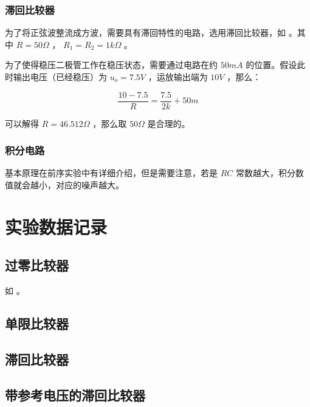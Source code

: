 \documentclass[lang=cn,11pt,a4paper,cite=authoryear]{elegantpaper}
\begin{document}

\subsubsection{滞回比较器}

为了将正弦波整流成方波，需要具有滞回特性的电路，选用滞回比较器，如  。其中 \(R = 50 \Omega\) ， \(R_1 = R_2 = 1 k\Omega\) 。

为了使得稳压二极管工作在稳压状态，需要通过电路在约 \(50 mA\) 的位置。假设此时输出电压（已经稳压）为 \(u_o = 7.5 V\) ，运放输出端为 \(10 V\) ，那么：

\[\frac{10 - 7.5}{R} = \frac{7.5}{2 k} + 50 m\]

可以解得 \(R = 46.512 \Omega\) ，那么取 \(50 \Omega\) 是合理的。


\subsubsection{积分电路} 

基本原理在前序实验中有详细介绍，但是需要注意，若是 \(R C\) 常数越大，积分数值就会越小，对应的噪声越大。

\section{实验数据记录}

\subsection{过零比较器}

如  。


\subsection{单限比较器}



\subsection{滞回比较器}

\subsection{带参考电压的滞回比较器}
\end{document}
